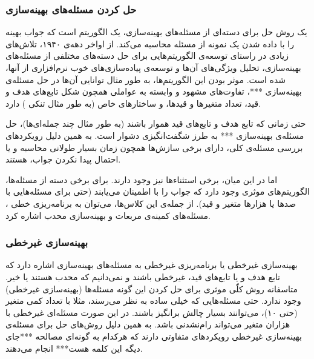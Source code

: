 \subsubsection{
حل کردن مسئله‌های بهینه‌سازی
}
یک روش حل
برای دسته‌ای از مسئله‌های بهینه‌سازی، یک الگوریتم
 است که جواب بهینه را با داده شدن یک نمونه از مسئله‌
محاسبه می‌کند. از اواخر دهه‌ی ۱۹۴۰، تلاش‌های زیادی در راستای توسعه‌ی الگوریتم‌هایی برای حل دسته‌های مختلفی از مسئله‌های بهینه‌سازی، تحلیل ویژگی‌های آن‌ها و توسعه‌ی پیاده‌سازی‌های خوب نرم‌افزاری از آنها، شده است. موثر بودن این الگوریتم‌ها، به طور مثال توانایی آن‌ها در حل مسئله‌ی بهینه‌سازی ***، تفاوت‌های مشهود و وابسته به عواملی همچون شکل تابع‌های هدف و قید، تعداد متغیرها و قیدها، و ساختارهای خاص (به طور مثال تنکی
)
دارد.


حتی زمانی که تابع هدف و تابع‌های قید هموار
باشند (به طور مثال چند جمله‌ای‌ها)، حل مسئله‌ی بهینه‌سازی *** به طرز شگفت‌انگیزی دشوار است. به همین دلیل رویکردهای بررسی مسئله‌ی کلی، دارای برخی سازش‌ها
همچون زمان بسیار طولانی محاسبه و یا احتمال پیدا نکردن جواب، هستند.


اما در این میان، برخی استثناء‌ها نیز وجود دارند. برای برخی دسته از مسئله‌ها، الگوریتم‌های موثری وجود دارد که جواب را با اطمینان می‌یابند (حتی برای مسئله‌هایی با صدها یا هزارها متغیر و قید). از جمله‌ی این کلاس‌ها، می‌توان به برنامه‌ریزی خطی
،
مسئله‌های کمینه‌ی مربعات
و بهینه‌سازی محدب اشاره کرد.





\subsubsection{
بهینه‌سازی غیرخطی
}
بهینه‌سازی غیرخطی
یا برنامه‌ریزی غیرخطی
به مسئله‌های بهینه‌سازی اشاره دارد که تابع هدف و یا تابع‌های قید، غیرخطی باشند و نمی‌دانیم که محدب هستند یا خیر. متاسفانه روش کلّی موثری برای حل کردن این گونه مسئله‌ها (بهینه‌سازی غیرخطی) وجود ندارد. حتی مسئله‌هایی که خیلی ساده به نظر می‌رسند، مثلا با تعداد کمی متغیر (حتی ۱۰)، می‌توانند بسیار چالش برانگیز باشند. در این صورت مسئله‌ای غیرخطی با هزاران متغیر می‌تواند رام‌نشدنی
باشد. به همین دلیل روش‌های حل برای مسئله‌ی بهینه‌سازی غیرخطی رویکردهای متفاوتی دارند که هرکدام به گونه‌ای مصالحه
***جای دیگه این کلمه هست***
انجام می‌دهند.

